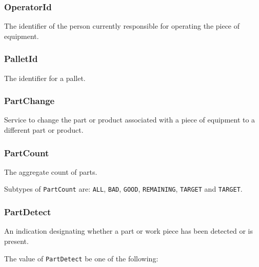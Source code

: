 \subsubsection{OperatorId}
  \label{sec:OperatorId}



The identifier of the person currently responsible for operating the piece of equipment.

\FloatBarrier

\subsubsection{PalletId}
  \label{sec:PalletId}



The identifier for a pallet.

\FloatBarrier

\subsubsection{PartChange}
  \label{sec:PartChange}



Service to change the part or product associated with a piece of equipment to a different part or product.

\FloatBarrier

\subsubsection{PartCount}
  \label{sec:PartCount}



The aggregate count of parts.


Subtypes of \texttt{PartCount} are: \texttt{ALL}, \texttt{BAD}, \texttt{GOOD}, \texttt{REMAINING}, \texttt{TARGET} and \texttt{TARGET}. 
\FloatBarrier

\subsubsection{PartDetect}
  \label{sec:PartDetect}



An indication designating whether a part or work piece has been detected or is present.



The value of \texttt{PartDetect} \MUST be one of the following: 


